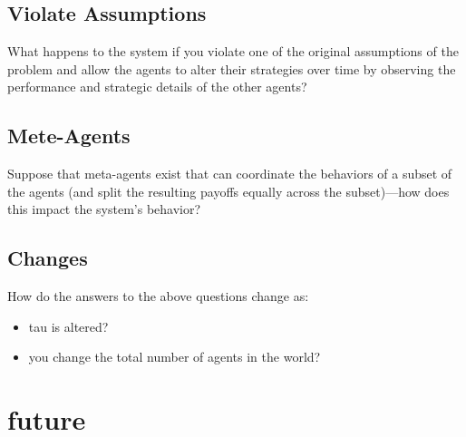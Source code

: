 \documentclass[]{article}
\begin{document}
\subsection{Violate Assumptions}What happens to the system if you violate one of the original assumptions of the problem and allow the agents to alter their strategies over time by observing the performance and strategic details of the other agents?
\subsection{Mete-Agents}Suppose that meta-agents exist that can coordinate the behaviors of a subset of the agents (and split the resulting payoffs equally across the subset)---how does this impact the system's behavior?
\subsection{Changes}How do the answers to the above questions change as:
\begin{itemize}
	\item tau is altered?
	\item you change the total number of agents in the world?
\end{itemize}

\section{future}

\medskip



\end{document}
